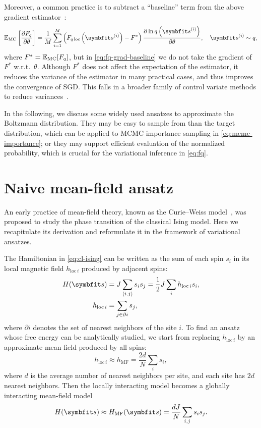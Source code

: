 Moreover, a common practice is to subtract a ``baseline'' term from the above gradient estimator~\cite{wu2019solving}:
\begin{equation}
\bbE_\text{MC}\left[ \frac{\partial F_q}{\partial \theta} \right]
= \frac{1}{M} \sum_{i = 1}^M \left( F_{q\,\text{loc}}\left( \vs^{(i)} \right) - F^* \right) \frac{\partial \ln q\left( \vs^{(i)} \right)}{\partial \theta}, \quad
\vs^{(i)} \sim q,
\label{eq:fq-grad-baseline}
\end{equation}
where $F^* = \mathbb{E}_\text{MC}[F_q]$, but in \cref{eq:fq-grad-baseline} we do not take the gradient of $F^*$ w.r.t.\ $\theta$. Although $F^*$ does not affect the expectation of the estimator, it reduces the variance of the estimator in many practical cases, and thus improves the convergence of SGD. This falls in a broader family of control variate methods to reduce variances~\cite{ranganath2014black}.

In the following, we discuss some widely used ansatzes to approximate the Boltzmann distribution. They may be easy to sample from than the target distribution, which can be applied to MCMC importance sampling in \cref{eq:mcmc-importance}; or they may support efficient evaluation of the normalized probability, which is crucial for the variational inference in \cref{eq:fq}.

\section{Naive mean-field ansatz}
\label{sec:nmf}

An early practice of mean-field theory, known as the Curie--Weiss model~\cite{weiss1907hypothese, nishimori2001statistical}, was proposed to study the phase transition of the classical Ising model. Here we recapitulate its derivation and reformulate it in the framework of variational ansatzes.

The Hamiltonian in \cref{eq:cl-ising} can be written as the sum of each spin $s_i$ in its local magnetic field $h_{\text{loc}\,i}$ produced by adjacent spins:
\begin{align}
H(\vs) &= J \sum_{\langle i, j \rangle} s_i s_j
= \frac{1}{2} J \sum_i h_{\text{loc}\,i} s_i, \\
h_{\text{loc}\,i} &= \sum_{j \in \partial i} s_j,
\end{align}
where $\partial i$ denotes the set of nearest neighbors of the site $i$. To find an ansatz whose free energy can be analytically studied, we start from replacing $h_{\text{loc}\,i}$ by an approximate mean field produced by all spins:
\begin{equation}
h_{\text{loc}\,i} \approx h_\text{MF} = \frac{2 d}{N} \sum_i s_i,
\end{equation}
where $d$ is the average number of nearest neighbors per site, and each site has $2 d$ nearest neighbors. Then the locally interacting model becomes a globally interacting mean-field model
\begin{equation}
H(\vs) \approx H_\text{MF}(\vs) = \frac{d J}{N} \sum_{i, j} s_i s_j.
\label{eq:ham-mf}
\end{equation}

